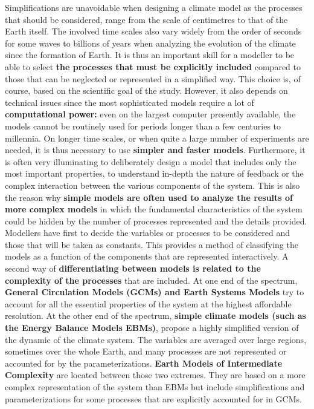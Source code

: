 \documentclass[12pt,oneside]{book}
\begin{document}
Simplifications are unavoidable when designing a climate model as the
processes that should be considered, range from the scale of centimetres
to that of the Earth itself. The involved time scales also vary widely
from the order of seconds for some waves to billions of years when
analyzing the evolution of the climate since the formation of Earth. It
is thus an important skill for a modeller to be able to select
\textbf{the processes that must be explicitly included} compared to
those that can be neglected or represented in a simplified way. This
choice is, of course, based on the scientific goal of the study.
However, it also depends on technical issues since the most
sophisticated models require a lot of \textbf{computational power:} even
on the largest computer presently available, the models cannot be
routinely used for periods longer than a few centuries to millennia. On
longer time scales, or when quite a large number of experiments are
needed, it is thus necessary to use \textbf{simpler and faster models}.
Furthermore, it is often very illuminating to deliberately design a
model that includes only the most important properties, to understand
in-depth the nature of feedback or the complex interaction between the
various components of the system. This is also the reason why
\textbf{simple models are often used to analyze the results of more
complex models} in which the fundamental characteristics of the system
could be hidden by the number of processes represented and the details
provided. Modellers have first to decide the variables or processes to
be considered and those that will be taken as constants. This provides a
method of classifying the models as a function of the components that
are represented interactively. A second way of \textbf{differentiating
between models is related to the complexity of the processes} that are
included. At one end of the spectrum, \textbf{General Circulation Models
(GCMs) and Earth Systems Models} try to account for all the essential
properties of the system at the highest affordable resolution. At the
other end of the spectrum, \textbf{simple climate models (such as the
Energy Balance Models EBMs)}, propose a highly simplified version of the
dynamic of the climate system. The variables are averaged over large
regions, sometimes over the whole Earth, and many processes are not
represented or accounted for by the parameterizations. \textbf{Earth
Models of Intermediate Complexity} are located between those two
extremes. They are based on a more complex representation of the system
than EBMs but include simplifications and parameterizations for some
processes that are explicitly accounted for in GCMs.
\end{document}
